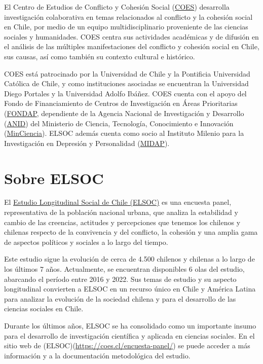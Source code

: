 \documentclass[
  12pt,
]{book}
\begin{document}
El Centro de Estudios de Conflicto y Cohesión Social (\href{https://coes.cl/}{COES}) desarrolla investigación colaborativa en temas relacionados al conflicto y la cohesión social en Chile, por medio de un equipo multidisciplinario proveniente de las ciencias sociales y humanidades. COES centra sus actividades académicas y de difusión en el análisis de las múltiples manifestaciones del conflicto y cohesión social en Chile, sus causas, así como también su contexto cultural e histórico.

COES está patrocinado por la Universidad de Chile y la Pontificia Universidad Católica de Chile, y como instituciones asociadas se encuentran la Universidad Diego Portales y la Universidad Adolfo Ibáñez. COES cuenta con el apoyo del Fondo de Financiamiento de Centros de Investigación en Áreas Prioritarias (\href{https://www.conicyt.cl/fondap/sobre-fondap/que-es-fondap/}{FONDAP}, dependiente de la Agencia Nacional de Investigación y Desarrollo (\href{https://www.anid.cl/}{ANID}) del Ministerio de Ciencia, Tecnología, Conocimiento e Innovación (\href{https://www.minciencia.gob.cl/}{MinCiencia}). ELSOC además cuenta como socio al Instituto Milenio para la Investigación en Depresión y Personalidad (\href{https://midap.org/}{MIDAP}).

\hypertarget{sobre-elsoc}{%
\section{Sobre ELSOC}\label{sobre-elsoc}}

El \href{https://coes.cl/encuesta-panel/}{Estudio Longitudinal Social de Chile (ELSOC)} es una encuesta panel, representativa de la población nacional urbana, que analiza la estabilidad y cambio de las creencias, actitudes y percepciones que tenemos los chilenos y chilenas respecto de la convivencia y del conflicto, la cohesión y una amplia gama de aspectos políticos y sociales a lo largo del tiempo.

Este estudio sigue la evolución de cerca de 4.500 chilenos y chilenas a lo largo de los últimos 7 años. Actualmente, se encuentran disponibles 6 olas del estudio, abarcando el período entre 2016 y 2022. Sus temas de estudio y su aspecto longitudinal convierten a ELSOC en un recurso único en Chile y América Latina para analizar la evolución de la sociedad chilena y para el desarrollo de las ciencias sociales en Chile.

Durante los últimos años, ELSOC se ha consolidado como un importante insumo para el desarrollo de investigación científica y aplicada en ciencias sociales. En el sitio web de (ELSOC)(\url{https://coes.cl/encuesta-panel/}) se puede acceder a más información y a la documentación metodológica del estudio.
\end{document}
